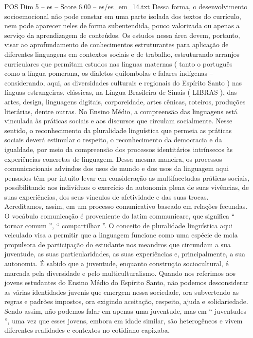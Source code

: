 \begin{textsample}{POS Dim 5 – es – Score 6.00 – es/es\_em\_14.txt}
Dessa forma, o desenvolvimento socioemocional não pode constar em uma parte isolada dos textos do currículo, nem pode aparecer neles de forma subentendida, pouco valorizada ou apenas a serviço da aprendizagem de conteúdos.
Os estudos nessa área devem, portanto, visar ao aprofundamento de conhecimentos estruturantes para aplicação de diferentes linguagens em contextos sociais e de trabalho, estruturando arranjos curriculares que permitam estudos nas línguas maternas ( tanto o português como a língua pomerana, os dialetos quilombolas e falares indígenas – considerando, aqui, as diversidades culturais e regionais do Espírito Santo ) nas línguas estrangeiras, clássicas, na Língua Brasileira de Sinais ( LIBRAS ), das artes, design, linguagens digitais, corporeidade, artes cênicas, roteiros, produções literárias, dentre outras.
No Ensino Médio, a compreensão das linguagens está vinculada às práticas sociais e aos discursos que circulam socialmente.
Nesse sentido, o reconhecimento da pluralidade linguística que permeia as práticas sociais deverá estimular o respeito, o reconhecimento da democracia e da igualdade, por meio da compreensão dos processos identitários intrínsecos às experiências concretas de linguagem.
Dessa mesma maneira, os processos comunicacionais advindos dos usos de mundo e dos usos da linguagem aqui pensados têm por intuito levar em consideração as multifacetadas práticas sociais, possibilitando aos indivíduos o exercício da autonomia plena de suas vivências, de suas experiências, dos seus vínculos de afetividade e das suas trocas.
Acreditamos, assim, em um processo comunicativo baseado em relações fecundas.
O vocábulo comunicação é proveniente do latim communicare, que significa “ tornar comum ”, “ compartilhar ”.
O conceito de pluralidade linguística aqui veiculado visa a permitir que a linguagem funcione como uma espécie de mola propulsora de participação do estudante nos meandros que circundam a sua juventude, as suas particularidades, as suas experiências e, principalmente, a sua autonomia.
É sabido que a juventude, enquanto construção sociocultural, é marcada pela diversidade e pelo multiculturalismo.
Quando nos referimos aos jovens estudantes do Ensino Médio do Espírito Santo, não podemos desconsiderar as várias identidades juvenis que emergem nessa sociedade, ora subvertendo as regras e padrões impostos, ora exigindo aceitação, respeito, ajuda e solidariedade.
Sendo assim, não podemos falar em apenas uma juventude, mas em “ juventudes ”, uma vez que esses jovens, embora em idade similar, são heterogêneos e vivem diferentes realidades e contextos no cotidiano capixaba.

\end{textsample}
